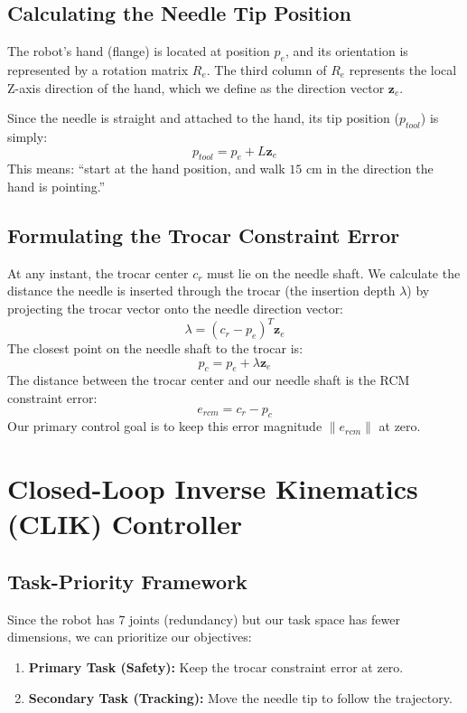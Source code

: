 \documentclass[11pt,a4paper]{article}
\begin{document}
\subsection{Calculating the Needle Tip Position}
The robot's hand (flange) is located at position $p_e$, and its orientation is represented by a rotation matrix $R_e$. The third column of $R_e$ represents the local Z-axis direction of the hand, which we define as the direction vector $\boldsymbol{z}_e$.

Since the needle is straight and attached to the hand, its tip position ($p_{tool}$) is simply:
\begin{equation}
    p_{tool} = p_e + L \boldsymbol{z}_e
\end{equation}
This means: ``start at the hand position, and walk $15\text{ cm}$ in the direction the hand is pointing.''

\subsection{Formulating the Trocar Constraint Error}
At any instant, the trocar center $c_r$ must lie on the needle shaft. We calculate the distance the needle is inserted through the trocar (the insertion depth $\lambda$) by projecting the trocar vector onto the needle direction vector:
\begin{equation}
    \lambda = (c_r - p_e)^T \boldsymbol{z}_e
\end{equation}
The closest point on the needle shaft to the trocar is:
\begin{equation}
    p_c = p_e + \lambda \boldsymbol{z}_e
\end{equation}
The distance between the trocar center and our needle shaft is the RCM constraint error:
\begin{equation}
    e_{rcm} = c_r - p_c
\end{equation}
Our primary control goal is to keep this error magnitude $\|e_{rcm}\|$ at zero.

\section{Closed-Loop Inverse Kinematics (CLIK) Controller}

\subsection{Task-Priority Framework}
Since the robot has 7 joints (redundancy) but our task space has fewer dimensions, we can prioritize our objectives:
\begin{enumerate}
    \item \textbf{Primary Task (Safety):} Keep the trocar constraint error at zero.
    \item \textbf{Secondary Task (Tracking):} Move the needle tip to follow the trajectory.
\end{enumerate}
\end{document}
